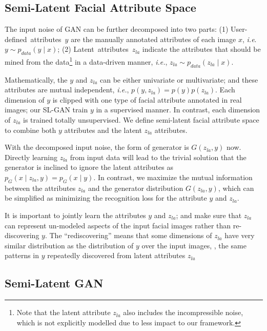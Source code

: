 \documentclass[10pt,letterpaper,twocolumn]{article}
\begin{document}
\subsection{Semi-Latent Facial Attribute Space}

The input noise of GAN can be further decomposed into two parts: (1)
User-defined~attributes~$y$ are the manually annotated attributes
of each image $x$, \emph{i.e}. $y\sim p_{data}\left(y\mid x\right)$;
(2) Latent~attributes~$z_{la}$ indicate the attributes that should
be mined from the data\footnote{Note that the latent attribute $z_{la}$ also includes the incompressible
noise, which is not explicitly modelled due to less impact to our
framework.} in a data-driven manner, \emph{i.e.}, $z_{la}\sim p_{data}\left(z_{la}\mid x\right)$.

Mathematically, the $y$ and $z_{la}$ can be either univariate or
multivariate; and these attributes are mutual independent, \emph{i.e.},
$p\left(y,z_{la}\right)=p\left(y\right)p\left(z_{la}\right)$. Each
dimension of $y$ is clipped with one type of facial attribute annotated
in real images; our SL-GAN train $y$ in a supervised manner. In contrast,
each dimension of $z_{la}$ is trained totally unsupervised. We define
semi-latent facial attribute space to combine both $y$ attributes
and the latent $z_{la}$ attributes.

With the decomposed input noise, the form of generator is $G\left(z_{la},y\right)$
now. Directly learning $z_{la}$ from input data will lead to the
trivial solution that the generator is inclined to ignore the latent
attributes as $p_{G}\left(x\mid z_{la},y\right)=p_{G}\left(x\mid y\right)$.
In contrast, we maximize the mutual information between the attributes
$z_{la}$ and the generator distribution $G\left(z_{la},y\right)$,
which can be simplified as minimizing the recognition loss for the
attribute $y$ and $z_{la}$.

It is important to jointly learn the attributes $y$ and $z_{la}$;
and make sure that $z_{la}$ can represent un-modeled aspects of the
input facial images rather than re-discovering $y$. The ``rediscovering''
means that some dimensions of $z_{la}$ have very similar distribution
as the distribution of $y$ over the input images, \ie, the same
patterns in $y$ repeatedly discovered from latent attributes $z_{la}$

\subsection{Semi-Latent GAN}
\end{document}
